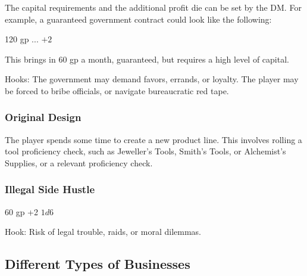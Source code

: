 \documentclass[twocolumn]{dndbook}
\begin{document}
The capital requirements and the additional profit die can be set by the DM.
For example, a guaranteed government contract could look like the following:

\begin{DndComment}[color=bgtan2018]{}
	\hfill 120 gp
	\hfill ...
	\hfill $+2$
\end{DndComment}


This brings in 60 gp a month, guaranteed, but requires a high level of capital.

Hooks: The government may demand favors, errands, or loyalty.
The player may be forced to bribe officials, or navigate bureaucratic red tape.\par

\subsubsection{Original Design}

The player spends some time to create a new product line.
This involves rolling a tool proficiency check, such as Jeweller's Tools, Smith's Tools, or
Alchemist's Supplies, or a relevant proficiency check.


\subsubsection{Illegal Side Hustle}

\begin{DndComment}[color=bgtan2018]{}
	\hfill 60 gp
	\hfill +2
	\hfill $1d6$
\end{DndComment}

Hook: Risk of legal trouble, raids, or moral dilemmas.\par

\subsection{Different Types of Businesses}
\end{document}
